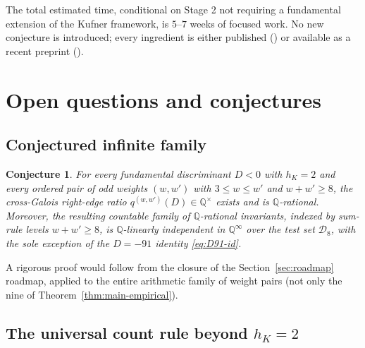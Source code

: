 \documentclass[11pt,a4paper]{amsart}
\theoremstyle{plain}
\newtheorem{conjecture}[theorem]{Conjecture}
\theoremstyle{definition}
\newcommand{\Q}{\mathbb{Q}}
\newcommand{\qstr}[2]{q^{(#1,#2)}}
\begin{document}
The total estimated time, conditional on Stage 2 not requiring a fundamental
extension of the Kufner framework, is $5$--$7$ weeks of focused work. No new
conjecture is introduced; every ingredient is either published
(\cite{KingsSprang2025, BrunaultChida2015, Cox1989}) or available as a
recent preprint (\cite{Kufner2024, KingsSprang2025survey}).

\section{Open questions and conjectures}\label{sec:open}

\subsection{Conjectured infinite family}\label{ss:open-infinite}

\begin{conjecture}\label{conj:infinite-family}
For every fundamental discriminant $D < 0$ with $h_K = 2$ and every ordered
pair of odd weights $(w, w')$ with $3 \le w \le w'$ and $w + w' \ge 8$, the
cross-Galois right-edge ratio $\qstr{w}{w'}(D) \in \Q^{\times}$ exists and
is $\Q$-rational. Moreover, the resulting countable family of
$\Q$-rational invariants, indexed by sum-rule levels $w + w' \ge 8$, is
$\Q$-linearly independent in $\Q^{\infty}$ over the test set
$\mathcal{D}_8$, with the sole exception of the $D = -91$ identity
\eqref{eq:D91-id}.
\end{conjecture}

A rigorous proof would follow from the closure of the
Section~\ref{sec:roadmap} roadmap, applied to the entire arithmetic family
of weight pairs (not only the nine of Theorem~\ref{thm:main-empirical}).

\subsection{The universal count rule beyond $h_K = 2$}\label{ss:open-hK4}
\end{document}
